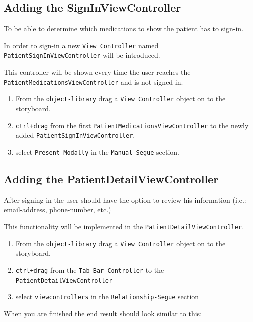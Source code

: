 \documentclass{article}
\begin{document}
\subsection{Adding the SignInViewController}\label{adding-the-signinviewcontroller}
To be able to determine which medications to show the patient has to
sign-in.

In order to sign-in a new \texttt{View\ Controller} named
\texttt{PatientSignInViewController} will be introduced.

This controller will be shown every time the user reaches the
\texttt{PatientMedicationsViewController} and is not signed-in.

\begin{enumerate}
\def\labelenumi{\arabic{enumi}.}
\item
  From the \texttt{object-library} drag a \texttt{View\ Controller}
  object on to the storyboard.
\item
  \texttt{ctrl+drag} from the first
  \texttt{PatientMedicationsViewController} to the newly added
  \texttt{PatientSignInViewController}.
\item
  select \texttt{Present\ Modally} in the \texttt{Manual-Segue} section.
\end{enumerate}

\subsection{Adding the PatientDetailViewController}\label{adding-the-patientdetailviewcontroller}

After signing in the user should have the option to review his
information (i.e.: email-address, phone-number, etc.)

This functionality will be implemented in the
\texttt{PatientDetailViewController}.

\begin{enumerate}
\def\labelenumi{\arabic{enumi}.}

\item
  From the \texttt{object-library} drag a \texttt{View\ Controller}
  object on to the storyboard.
\item
  \texttt{ctrl+drag} from the \texttt{Tab\ Bar\ Controller} to the
  \texttt{PatientDetailViewController}
\item
  select \texttt{viewcontrollers} in the \texttt{Relationship-Segue}
  section
\end{enumerate}

When you are finished the end result should look similar to this:
\end{document}

